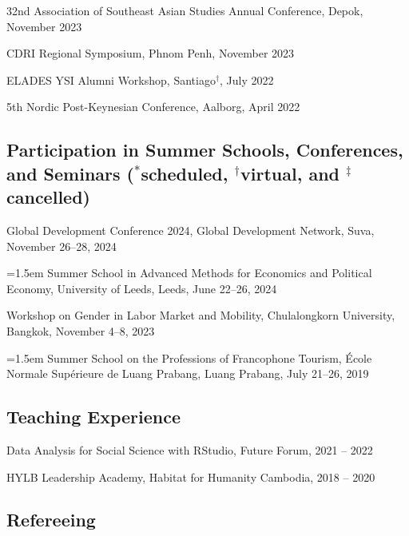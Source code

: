\documentclass[10pt,a4paper]{article}
\begin{document}
32nd Association of Southeast Asian Studies Annual Conference, Depok, November 2023

CDRI Regional Symposium, Phnom Penh, November 2023

ELADES YSI Alumni Workshop, Santiago$^\dag$, July 2022

5th Nordic Post-Keynesian Conference, Aalborg, April 2022

\subsection*{Participation in Summer Schools, Conferences, and Seminars ($^\ast$scheduled, $^\dag$virtual, and $^\ddag$cancelled)}

Global Development Conference 2024, Global Development Network, Suva, November 26--28, 2024 

\hangindent=1.5em
Summer School in Advanced Methods for Economics and Political Economy, University of Leeds, Leeds, June 22--26, 2024

Workshop on Gender in Labor Market and Mobility, Chulalongkorn University, Bangkok, November 4--8, 2023

\hangindent=1.5em
Summer School on the Professions of Francophone Tourism, École Normale Supérieure de Luang Prabang, Luang Prabang, July 21–26, 2019


\subsection*{Teaching Experience}

Data Analysis for Social Science with RStudio, Future Forum, 2021 -- 2022

HYLB Leadership Academy, Habitat for Humanity Cambodia, 2018 -- 2020

\subsection*{Refereeing}
\end{document}
